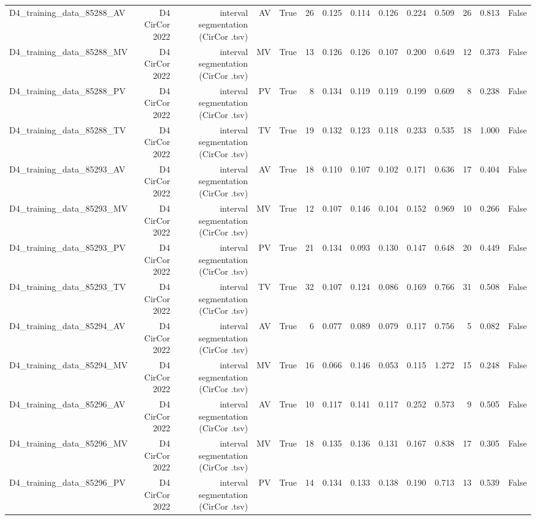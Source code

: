 \begin{table}[htbp]
\begin{tabular}{lrrrrrrrrrrrrr}
    D4\_training\_data\_85288\_AV & D4 CirCor 2022 & interval segmentation (CirCor .tsv) & AV & True & 26 & 0.125 & 0.114 & 0.126 & 0.224 & 0.509 & 26 & 0.813 & False \\
    D4\_training\_data\_85288\_MV & D4 CirCor 2022 & interval segmentation (CirCor .tsv) & MV & True & 13 & 0.126 & 0.126 & 0.107 & 0.200 & 0.649 & 12 & 0.373 & False \\
    D4\_training\_data\_85288\_PV & D4 CirCor 2022 & interval segmentation (CirCor .tsv) & PV & True & 8 & 0.134 & 0.119 & 0.119 & 0.199 & 0.609 & 8 & 0.238 & False \\
    D4\_training\_data\_85288\_TV & D4 CirCor 2022 & interval segmentation (CirCor .tsv) & TV & True & 19 & 0.132 & 0.123 & 0.118 & 0.233 & 0.535 & 18 & 1.000 & False \\
    D4\_training\_data\_85293\_AV & D4 CirCor 2022 & interval segmentation (CirCor .tsv) & AV & True & 18 & 0.110 & 0.107 & 0.102 & 0.171 & 0.636 & 17 & 0.404 & False \\
    D4\_training\_data\_85293\_MV & D4 CirCor 2022 & interval segmentation (CirCor .tsv) & MV & True & 12 & 0.107 & 0.146 & 0.104 & 0.152 & 0.969 & 10 & 0.266 & False \\
    D4\_training\_data\_85293\_PV & D4 CirCor 2022 & interval segmentation (CirCor .tsv) & PV & True & 21 & 0.134 & 0.093 & 0.130 & 0.147 & 0.648 & 20 & 0.449 & False \\
    D4\_training\_data\_85293\_TV & D4 CirCor 2022 & interval segmentation (CirCor .tsv) & TV & True & 32 & 0.107 & 0.124 & 0.086 & 0.169 & 0.766 & 31 & 0.508 & False \\
    D4\_training\_data\_85294\_AV & D4 CirCor 2022 & interval segmentation (CirCor .tsv) & AV & True & 6 & 0.077 & 0.089 & 0.079 & 0.117 & 0.756 & 5 & 0.082 & False \\
    D4\_training\_data\_85294\_MV & D4 CirCor 2022 & interval segmentation (CirCor .tsv) & MV & True & 16 & 0.066 & 0.146 & 0.053 & 0.115 & 1.272 & 15 & 0.248 & False \\
    D4\_training\_data\_85296\_AV & D4 CirCor 2022 & interval segmentation (CirCor .tsv) & AV & True & 10 & 0.117 & 0.141 & 0.117 & 0.252 & 0.573 & 9 & 0.505 & False \\
    D4\_training\_data\_85296\_MV & D4 CirCor 2022 & interval segmentation (CirCor .tsv) & MV & True & 18 & 0.135 & 0.136 & 0.131 & 0.167 & 0.838 & 17 & 0.305 & False \\
    D4\_training\_data\_85296\_PV & D4 CirCor 2022 & interval segmentation (CirCor .tsv) & PV & True & 14 & 0.134 & 0.133 & 0.138 & 0.190 & 0.713 & 13 & 0.539 & False \\

\end{tabular}
\end{table}
